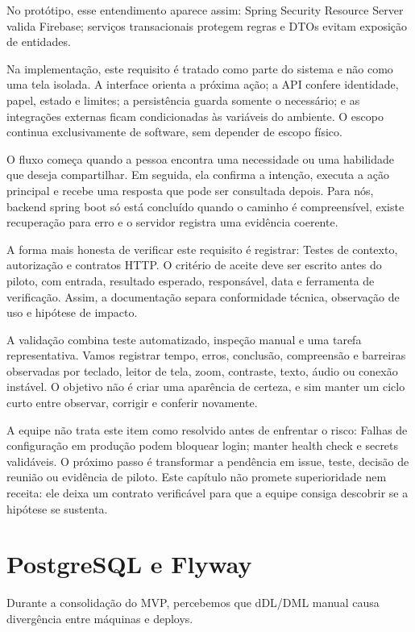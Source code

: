 \documentclass[12pt,oneside,a4paper,article]{abntex2}
\begin{document}
No protótipo, esse entendimento aparece assim: Spring Security Resource Server valida Firebase; serviços transacionais protegem regras e DTOs evitam exposição de entidades.

Na implementação, este requisito é tratado como parte do sistema e não como uma tela isolada. A interface orienta a próxima ação; a API confere identidade, papel, estado e limites; a persistência guarda somente o necessário; e as integrações externas ficam condicionadas às variáveis do ambiente. O escopo continua exclusivamente de software, sem depender de escopo físico.

O fluxo começa quando a pessoa encontra uma necessidade ou uma habilidade que deseja compartilhar. Em seguida, ela confirma a intenção, executa a ação principal e recebe uma resposta que pode ser consultada depois. Para nós, backend spring boot só está concluído quando o caminho é compreensível, existe recuperação para erro e o servidor registra uma evidência coerente.

A forma mais honesta de verificar este requisito é registrar: Testes de contexto, autorização e contratos HTTP. O critério de aceite deve ser escrito antes do piloto, com entrada, resultado esperado, responsável, data e ferramenta de verificação. Assim, a documentação separa conformidade técnica, observação de uso e hipótese de impacto.

A validação combina teste automatizado, inspeção manual e uma tarefa representativa. Vamos registrar tempo, erros, conclusão, compreensão e barreiras observadas por teclado, leitor de tela, zoom, contraste, texto, áudio ou conexão instável. O objetivo não é criar uma aparência de certeza, e sim manter um ciclo curto entre observar, corrigir e conferir novamente.

A equipe não trata este item como resolvido antes de enfrentar o risco: Falhas de configuração em produção podem bloquear login; manter health check e secrets validáveis. O próximo passo é transformar a pendência em issue, teste, decisão de reunião ou evidência de piloto. Este capítulo não promete superioridade nem receita: ele deixa um contrato verificável para que a equipe consiga descobrir se a hipótese se sustenta.

\section{PostgreSQL e Flyway}
Durante a consolidação do MVP, percebemos que dDL/DML manual causa divergência entre máquinas e deploys.
\end{document}

